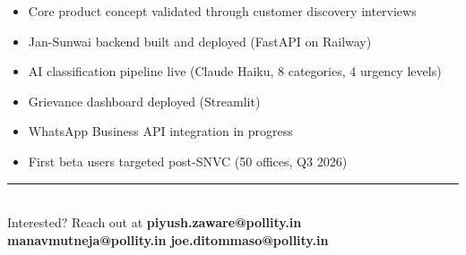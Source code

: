 \documentclass[11pt, a4paper]{article}
\begin{document}
\begin{tcolorbox}[colback=lightgray, colframe=pollityblue, sharp corners, boxrule=0.5pt]
\begin{itemize}[leftmargin=1.5em, itemsep=3pt, topsep=2pt]
  \item[$\checkmark$] Core product concept validated through customer discovery interviews
  \item[$\checkmark$] Jan-Sunwai backend built and deployed (FastAPI on Railway)
  \item[$\checkmark$] AI classification pipeline live (Claude Haiku, 8 categories, 4 urgency levels)
  \item[$\checkmark$] Grievance dashboard deployed (Streamlit)
  \item[$\rightarrow$] WhatsApp Business API integration in progress
  \item[$\rightarrow$] First beta users targeted post-SNVC (50 offices, Q3 2026)
\end{itemize}
\end{tcolorbox}

\vspace{1em}
\begin{center}
{\color{pollityblue}\rule{0.5\linewidth}{0.4pt}}\\[0.5em]
{\small Interested? Reach out at \textbf{piyush.zaware@pollity.in} \textbar{} \textbf{manavmutneja@pollity.in} \textbar{} \textbf{joe.ditommaso@pollity.in}}
\end{center}
\end{document}
